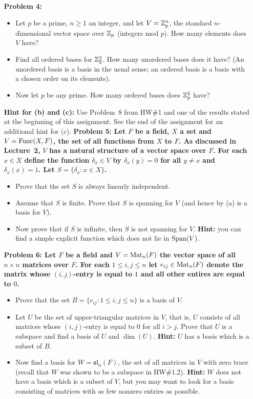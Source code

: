 \documentclass[11pt]{amsart}
\begin{document}
 \bf{Problem 4: }\rm 
\begin{itemize}
\item[(a)] Let $p$ be a prime, $n\geq 1$ an integer, and let $V={\mathbb Z}_p^n$, the standard $n$-dimensional vector space
over ${\mathbb Z}_p$ (integers mod $p$). How many elements does $V$ have?
\item[(b)] Find all ordered bases for ${\mathbb Z}_2^2$. How many unordered bases does it have?
(An unordered basis is a basis in the usual sense; an ordered basis is a basis with a chosen order on its elements).
\item[(c)] Now let $p$ be any prime. How many ordered bases does ${\mathbb Z}_p^2$ have? 
\end{itemize}
{\bf Hint for (b) and (c):} Use Problem~8 from HW\#1 and one of the results stated at the beginning of this assignment.
See the end of the assignment for an additional hint for (c). 
\skv
 \bf{Problem 5: }\rm Let $F$ be a field, $X$ a set and $V={\rm Func}(X,F)$, the set of all functions from $X$ to $F$. 
As discussed in Lecture~2, $V$ has a natural structure of a vector space over $F$. For each $x\in X$ define
the function $\delta_x\in V$ by $\delta_x(y)=0$ for all $y\neq x$ and $\delta_{x}(x)=1$. Let $S=\{\delta_x: x\in X\}$.
\begin{itemize}
\item[(a)] Prove that the set $S$ is always linearly independent.
\item[(b)] Assume that $S$ is finite. Prove that $S$ is spanning for $V$ (and hence by (a) is a basis for $V$).
\item[(c)] Now prove that if $S$ is infinite, then $S$ is not spanning for $V$. {\bf Hint:} you can find a simple
explicit function which does not lie in ${\rm Span}(V)$.
\end{itemize}
\skv
 \bf{Problem 6: }\rm Let $F$ be a field and $V={\rm Mat}_n(F)$ the vector space of all $n\times n$
matrices over $F$. For each $1\leq i,j\leq n$ let $e_{ij}\in {\rm Mat}_n(F)$ denote the matrix
whose $(i,j)$-entry is equal to $1$ and all other entires are equal to $0$.
\begin{itemize}
\item[(a)] Prove that the set $B=\{e_{ij} : 1\leq i,j\leq n \}$ is a basis of $V$.
\item[(b)] Let $U$ be the set of upper-triangular matrices in $V$, that is,
$U$ consists of all matrices whose $(i,j)$-entry is equal to $0$ for all $i>j$.
Prove that $U$ is a subspace and find a basis of $U$ and $\dim(U)$.
{\bf Hint:} $U$ has a basis which is a subset of $B$.
\item[(c)] Now find a basis for $W=\mathfrak{sl}_n(F)$, the set of all matrices in $V$ with zero trace
(recall that $W$ was shown to be a subspace in HW\#1.2). {\bf Hint:} $W$ does not have a basis
which is a subset of $V$, but you may want to look for a basis consisting of matrices with as few nonzero entries as possible.
\end{itemize}
\end{document}
